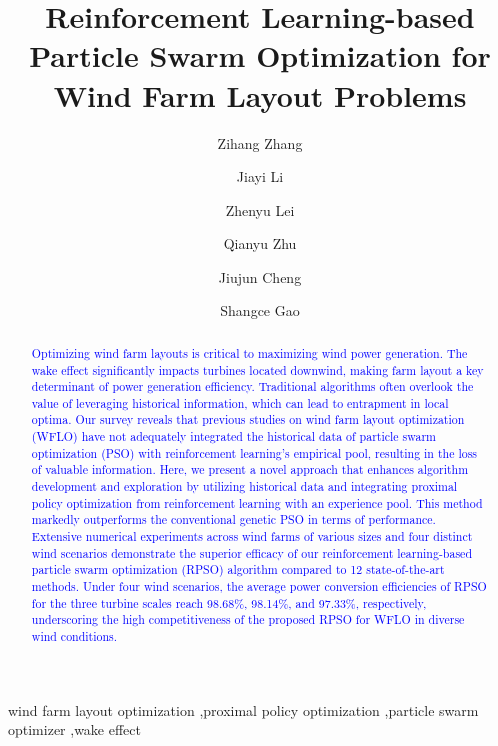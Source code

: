 \documentclass[review]{elsarticle}
\begin{document}
	\begin{frontmatter}
	\title{Reinforcement Learning-based Particle Swarm Optimization for Wind Farm Layout Problems}
	\author[label1]{Zihang Zhang} %
	\author[label1]{Jiayi Li}%
	\author[label1]{Zhenyu Lei} %
	\author[label1]{Qianyu Zhu} %
	\author[label2]{Jiujun Cheng}%
	\author[label1]{Shangce Gao}
	\address[label1]{Faculty of Engineering, University of Toyama, Toyama-shi, 930-8555 Japan.}
	\address[label2]{Key Laboratory of Embedded System and Service Computing, Ministry of Education, Tongji University, Shanghai, 200092 China.}
\begin{abstract}

\textcolor{blue}{Optimizing wind farm layouts is critical to maximizing wind power generation. The wake effect significantly impacts turbines located downwind, making farm layout a key determinant of power generation efficiency. Traditional algorithms often overlook the value of leveraging historical information, which can lead to entrapment in local optima. Our survey reveals that previous studies on wind farm layout optimization (WFLO) have not adequately integrated the historical data of particle swarm optimization (PSO) with reinforcement learning’s empirical pool, resulting in the loss of valuable information. Here, we present a novel approach that enhances algorithm development and exploration by utilizing historical data and integrating proximal policy optimization from reinforcement learning with an experience pool. This method markedly outperforms the conventional genetic PSO in terms of performance. Extensive numerical experiments across wind farms of various sizes and four distinct wind scenarios demonstrate the superior efficacy of our reinforcement learning-based particle swarm optimization (RPSO) algorithm compared to 12 state-of-the-art methods. Under four wind scenarios, the average power conversion efficiencies of RPSO for the three turbine scales reach 98.68$\%$, 98.14$\%$, and 97.33$\%$, respectively, underscoring the high competitiveness of the proposed RPSO for WFLO in diverse wind conditions.}

\end{abstract}

\begin{keyword}
wind farm layout optimization \sep proximal policy optimization \sep particle swarm optimizer  \sep wake effect
\end{keyword}

\end{frontmatter}
\end{document}
